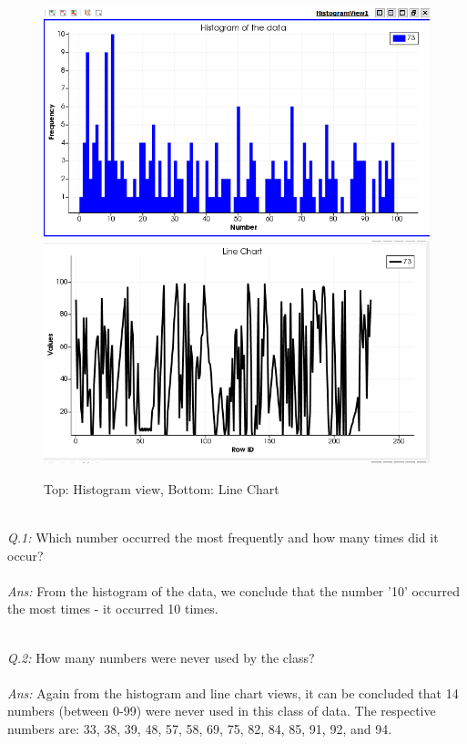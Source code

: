 \documentclass[a4paper,11pt]{article}
\theoremstyle{mytheor}
\begin{document}
\begin{figure}[!h]
    \centering
    \includegraphics[scale=0.95]{Q1_H.PNG}
    \includegraphics[scale=0.95]{Q1_L.PNG}
    \caption{Top: Histogram view, Bottom: Line Chart}
    \label{fig:q1}
\end{figure}
\clearpage
\textit{\\ Q.1:} Which number occurred the most frequently and how many times did it occur? \\ \\
\textit{Ans:} From the histogram of the data, we conclude that the number '10' occurred the most times - it occurred 10 times. 

\textit{\\ Q.2:} How many numbers were never used by the class?\\ \\
\textit{Ans:} Again from the histogram and line chart views, it can be concluded that 14 numbers (between 0-99) were never used in this class of data. The respective numbers are: 33, 38, 39, 48, 57, 58, 69, 75, 82, 84, 85, 91, 92, and 94. 
\end{document}
